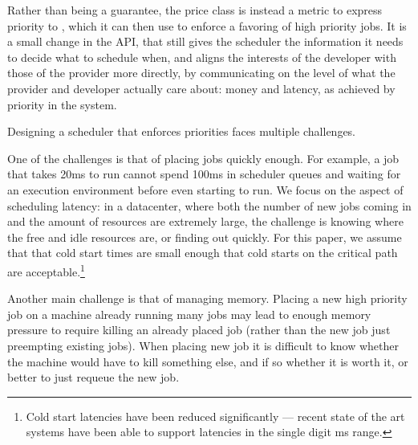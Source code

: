 Rather than being a guarantee, the price class is instead a metric to express
priority to \sys{}, which it can then use to enforce a favoring of high priority
jobs. It is a small change in the API, that still gives the scheduler the
information it needs to decide what to schedule when, and aligns the interests
of the developer with those of the provider more directly, by communicating on
the level of what the provider and developer actually care about: money and
latency, as achieved by priority in the system.




Designing a scheduler that enforces priorities faces multiple challenges. 

One of the challenges is that of placing jobs quickly enough. For example, a job
that takes 20ms to run cannot spend 100ms in scheduler queues and waiting for an
execution environment before even starting to run. We focus on the aspect of
scheduling latency: in a datacenter, where both the number of new jobs coming in
and the amount of resources are extremely large, the challenge is knowing where
the free and idle resources are, or finding out quickly. For this paper, we
assume that that cold start times are small enough that cold starts on the
critical path are acceptable.\footnote{Cold start latencies have been reduced
significantly --- recent state of the art systems have been able to support
latencies in the single digit ms range\cite{TODO}.}

Another main challenge is that of managing memory. Placing a new high priority
job on a machine already running many jobs may lead to enough memory pressure to
require killing an already placed job (rather than the new job just preempting
existing jobs). When placing new job it is difficult to know whether the machine
would have to kill something else, and if so whether it is worth it, or better
to just requeue the new job.






